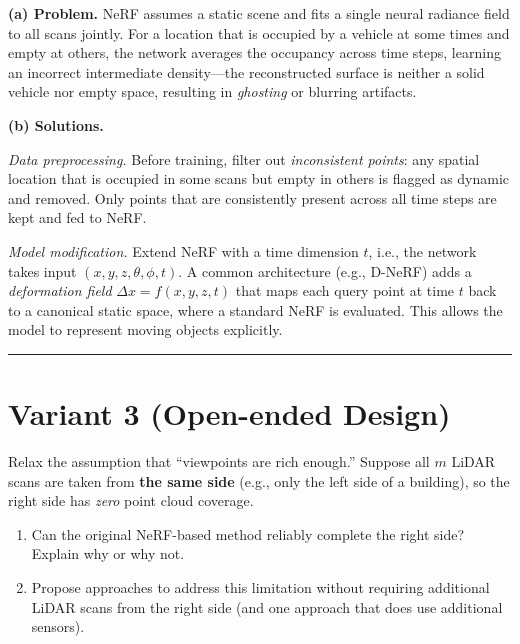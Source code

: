 \documentclass[12pt]{article}
\begin{document}
\begin{answerbox}
\textbf{(a) Problem.}
NeRF assumes a static scene and fits a single neural radiance field to all
scans jointly. For a location that is occupied by a vehicle at some times and
empty at others, the network averages the occupancy across time steps,
learning an incorrect intermediate density---the reconstructed surface is
neither a solid vehicle nor empty space, resulting in \emph{ghosting} or
blurring artifacts.

\medskip
\textbf{(b) Solutions.}

\textit{Data preprocessing.}
Before training, filter out \emph{inconsistent points}: any spatial location
that is occupied in some scans but empty in others is flagged as dynamic and
removed. Only points that are consistently present across all time steps are
kept and fed to NeRF.

\textit{Model modification.}
Extend NeRF with a time dimension $t$, i.e., the network takes input
$(x, y, z, \theta, \phi, t)$. A common architecture (e.g., D-NeRF) adds a
\emph{deformation field} $\Delta x = f(x,y,z,t)$ that maps each query point
at time $t$ back to a canonical static space, where a standard NeRF is
evaluated. This allows the model to represent moving objects explicitly.
\end{answerbox}

\bigskip
\hrule
\bigskip

\section*{Variant 3 (Open-ended Design)}

Relax the assumption that ``viewpoints are rich enough.''  Suppose all $m$
LiDAR scans are taken from \textbf{the same side} (e.g., only the left side of
a building), so the right side has \emph{zero} point cloud coverage.

\begin{enumerate}[label=(\alph*)]
    \item Can the original NeRF-based method reliably complete the right side?
          Explain why or why not.
    \item Propose approaches to address this limitation without requiring
          additional LiDAR scans from the right side (and one approach that
          does use additional sensors).
\end{enumerate}
\end{document}
